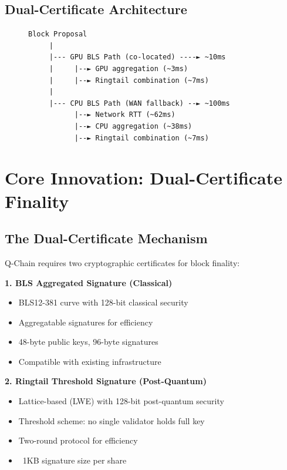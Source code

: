 \documentclass[11pt]{article}
\begin{document}
\subsection{Dual-Certificate Architecture}

\begin{figure}[h]
\centering
\begin{verbatim}
Block Proposal
     |
     |--- GPU BLS Path (co-located) ----► ~10ms
     |     |--► GPU aggregation (~3ms)
     |     |--► Ringtail combination (~7ms)
     |
     |--- CPU BLS Path (WAN fallback) --► ~100ms
           |--► Network RTT (~62ms)
           |--► CPU aggregation (~38ms)
           |--► Ringtail combination (~7ms)
\end{verbatim}

\label{fig:dual-cert}
\end{figure}

\section{Core Innovation: Dual-Certificate Finality}

\subsection{The Dual-Certificate Mechanism}

Q-Chain requires two cryptographic certificates for block finality:

\textbf{1. BLS Aggregated Signature (Classical)}
\begin{itemize}
\item BLS12-381 curve with 128-bit classical security
\item Aggregatable signatures for efficiency
\item 48-byte public keys, 96-byte signatures
\item Compatible with existing infrastructure
\end{itemize}

\textbf{2. Ringtail Threshold Signature (Post-Quantum)}
\begin{itemize}
\item Lattice-based (LWE) with 128-bit post-quantum security
\item Threshold scheme: no single validator holds full key
\item Two-round protocol for efficiency
\item ~1KB signature size per share
\end{itemize}
\end{document}
